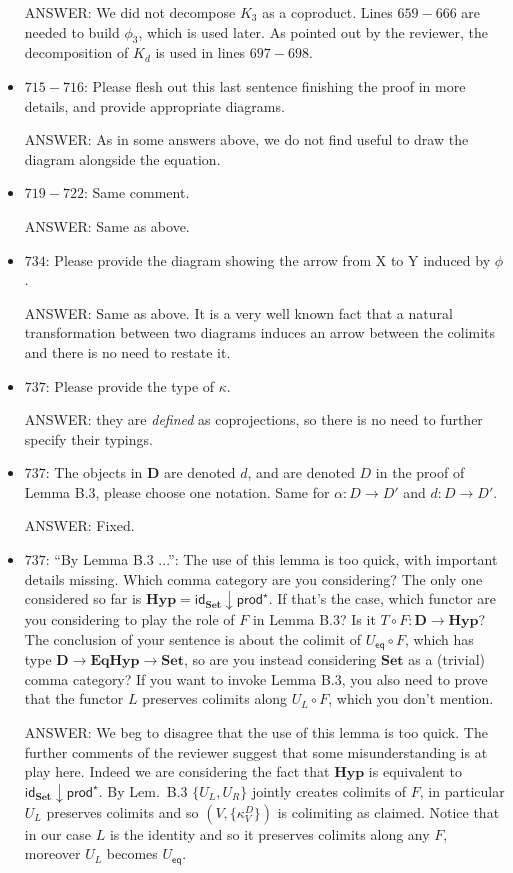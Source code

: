 \documentclass[english,11pt,a4paper]{article}
\begin{document}
\begin{itemize}
ANSWER: We did not decompose $K_3$ as a coproduct. Lines $659-666$ are needed to build $\phi_3$, which is used later. As pointed out by the reviewer, the decomposition of $K_d$ is used in lines $697-698$.

\item $715-716$: Please flesh out this last sentence finishing the proof in more details, and provide appropriate diagrams.

ANSWER: As in some answers above, we do not find useful to draw the diagram alongside the equation.

\item $719-722$: Same comment.

ANSWER: Same as above.

\item $734$: Please provide the diagram showing the arrow from X to Y induced by $\phi$.

ANSWER: Same as above. It is a very well known fact that a natural transformation between two diagrams induces an arrow between the colimits and there is no need to restate it.

\item $737$: Please provide the type of $\kappa$.

ANSWER: they are \emph{defined} as coprojections, so there is no need to further specify their typings.


\item $737$: The objects in $\mathbf{D}$ are denoted $d$, and are denoted $D$ in the proof of Lemma B.3, please choose one notation. Same for $\alpha: D \to  D'$ and $d: D \to  D'$.

ANSWER: Fixed.

\item $737$: ``By Lemma B.3 ...'': The use of this lemma is too quick, with important details missing. Which comma category are you considering? The only one considered so far is $\mathbf{Hyp} = \mathsf{id}_{\mathbf{Set}} \downarrow \mathsf{prod}^\star$. If that's the case, which functor are you considering to play the role of $F$ in Lemma B.3? Is it $T\circ F : \mathbf{D} \to  \mathbf{Hyp}$? The conclusion of your sentence is about the colimit of $U_{\mathsf{eq}}\circ F$, which has type $\mathbf{D} \to \mathbf{EqHyp} \to \mathbf{Set}$, so are you instead considering $\mathbf{Set}$ as a (trivial) comma category? If you want to invoke Lemma B.3, you also need to prove that the functor $L$ preserves colimits along $U_L \circ F$, which you don't mention.

ANSWER: We beg to disagree that the use of this lemma is too quick. The further comments of the reviewer suggest that some misunderstanding is at play here. Indeed we are considering the fact that $\mathbf{Hyp}$ is equivalent to $\mathsf{id}_{\mathbf{Set}} \downarrow \mathsf{prod}^\star$. By Lem.~B.3 $\{U_L, U_R\}$ jointly creates colimits of $F$, in particular $U_L$ preserves colimits and so $(V, \{\kappa^D_V\})$ is colimiting as claimed. Notice that in our case $L$  is the identity and so it preserves colimits along any $F$, moreover $U_L$ becomes $U_{\mathsf{eq}}$.


\end{itemize}
\end{document}
